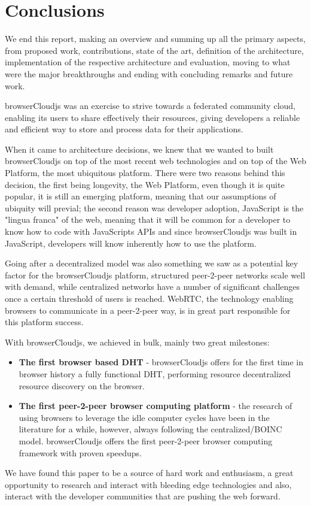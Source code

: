 
%
%

\section{Conclusions}

We end this report, making an overview and summing up all the primary aspects, from proposed work, contributions, state of the art, definition of the architecture, implementation of the respective architecture and evaluation, moving to what were the major breakthroughs and ending with concluding remarks and future work.

browserCloudjs was an exercise to strive towards a federated community cloud, enabling its users to share effectively their resources, giving developers a reliable and efficient way to store and process data for their applications.

When it came to architecture decisions, we knew that we wanted to built browserCloudjs on top of the most recent web technologies and on top of the Web Platform, the most ubiquitous platform. There were two reasons behind this decision, the first being longevity, the Web Platform, even though it is quite popular, it is still an emerging platform, meaning that our assumptions of ubiquity will previal; the second reason was developer adoption, JavaScript is the "lingua franca" of the web, meaning that it will be common for a developer to know how to code with JavaScripts APIs and since browserCloudjs was built in JavaScript, developers will know inherently how to use the platform.

Going after a decentralized model was also something we saw as a potential key factor for the browserCloudjs platform, structured peer-2-peer networks scale well with demand, while centralized networks have a number of significant challenges once a certain threshold of users is reached. WebRTC, the technology enabling browsers to communicate in a peer-2-peer way, is in great part responsible for this platform success.

With browserCloudjs, we achieved in bulk, mainly two great milestones:

\begin{itemize}
    \item \textbf{The first browser based DHT} - browserCloudjs offers for the first time in browser history a fully functional DHT, performing resource decentralized resource discovery on the browser. 
    \item \textbf{The first peer-2-peer browser computing platform} - the research of using browsers to leverage the idle computer cycles have been in the literature for a while, however, always following the centralized/BOINC model. browserCloudjs offers the first peer-2-peer browser computing framework with proven speedups.
\end{itemize}

We have found this paper to be a source of hard work and enthusiasm, a great opportunity to research and interact with bleeding edge technologies and also, interact with the developer communities that are pushing the web forward.
